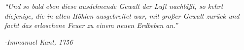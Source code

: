 \clearpage
{}

\begin{center}
\vspace*{11cm}
\textit{``Und so bald eben diese ausdehnende Gewalt der Luft nachl\"aßt, so kehrt diejenige, die in allen H\"ohlen ausgebreitet  war, mit großer Gewalt zur\"uck und facht das erloschene Feuer zu einem neuen Erdbeben an.''}
\end{center}
\par
\hspace*{7cm}
\textit{-Immanuel Kant, 1756 \cite{Kant}}
